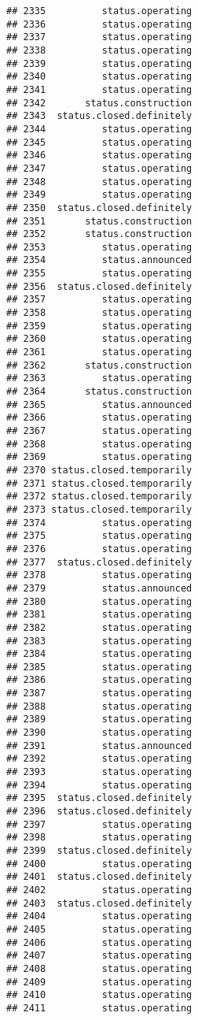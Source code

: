 \documentclass[
]{article}
\begin{document}
\begin{verbatim}
## 2335          status.operating
## 2336          status.operating
## 2337          status.operating
## 2338          status.operating
## 2339          status.operating
## 2340          status.operating
## 2341          status.operating
## 2342       status.construction
## 2343  status.closed.definitely
## 2344          status.operating
## 2345          status.operating
## 2346          status.operating
## 2347          status.operating
## 2348          status.operating
## 2349          status.operating
## 2350  status.closed.definitely
## 2351       status.construction
## 2352       status.construction
## 2353          status.operating
## 2354          status.announced
## 2355          status.operating
## 2356  status.closed.definitely
## 2357          status.operating
## 2358          status.operating
## 2359          status.operating
## 2360          status.operating
## 2361          status.operating
## 2362       status.construction
## 2363          status.operating
## 2364       status.construction
## 2365          status.announced
## 2366          status.operating
## 2367          status.operating
## 2368          status.operating
## 2369          status.operating
## 2370 status.closed.temporarily
## 2371 status.closed.temporarily
## 2372 status.closed.temporarily
## 2373 status.closed.temporarily
## 2374          status.operating
## 2375          status.operating
## 2376          status.operating
## 2377  status.closed.definitely
## 2378          status.operating
## 2379          status.announced
## 2380          status.operating
## 2381          status.operating
## 2382          status.operating
## 2383          status.operating
## 2384          status.operating
## 2385          status.operating
## 2386          status.operating
## 2387          status.operating
## 2388          status.operating
## 2389          status.operating
## 2390          status.operating
## 2391          status.announced
## 2392          status.operating
## 2393          status.operating
## 2394          status.operating
## 2395  status.closed.definitely
## 2396  status.closed.definitely
## 2397          status.operating
## 2398          status.operating
## 2399  status.closed.definitely
## 2400          status.operating
## 2401  status.closed.definitely
## 2402          status.operating
## 2403  status.closed.definitely
## 2404          status.operating
## 2405          status.operating
## 2406          status.operating
## 2407          status.operating
## 2408          status.operating
## 2409          status.operating
## 2410          status.operating
## 2411          status.operating

\end{verbatim}
\end{document}
